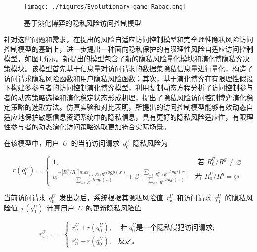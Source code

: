 \documentclass[pdftex,notypeinfo,twoside,openany,UTF8,fntef]{CASthesis}
\theoremstyle{THrm}{
	\newtheorem{question}{Question}[section]
	\newtheorem{property}{性质}[section]
	\newtheorem{assumption}{假设}[section]
	\newtheorem{claim}[lemma]{断言}
	
}
\begin{document}
\begin{figure}[htbp]
	\centering
	\texttt{[image: ./figures/Evolutionary-game-Rabac.png]}
	\caption{基于演化博弈的隐私风险访问控制模型}
	\label{fig:Evolutionary-game-Rabac}
\end{figure}

针对这些问题和需求，在提出的风险自适应访问控制模型和完全理性隐私风险访问控制模型的基础上，进一步提出一种面向隐私保护的有限理性风险自适应访问控制模型，如图\ref{fig:Evolutionary-game-Rabac}所示。新提出的模型包含了新的隐私风险量化模块和演化博隐私弈决策模块。该模型首先基于信息量对访问请求的数据集隐私信息量进行量化，构造了访问请求隐私风险函数和用户隐私风险函数；其次，基于演化博弈在有限理性假设下构建多参与者的访问控制演化博弈模型，利用复制动态方程分析了访问控制参与者的动态策略选择和演化稳定状态形成机理，提出了隐私风险访问控制博弈演化稳定策略的选取方法。仿真实验和对比表明，所提出的访问控制模型能够有效动态自适应地保护敏感信息资源系统中的隐私信息，具有更好的隐私风险适应性，有限理性参与者的动态演化访问策略选取更加符合实际场景。

在该模型中，用户~$U$~的当前访问请求~$q_{0}^{U}$~隐私风险为

\begin{equation}
r(q_{0}^{U})=\begin{cases}
1, & \text{ 若 } R_{0}^{U}/{{R}^{g}}\ne \varnothing \\
\alpha \frac{-|R_{0}^{U}/{R}^{U}|max_{x\in R_{0}^{U}/{R}^{U}}logp(x)}{-\sum_{x\in{R^U}}logp(x)}+ \beta \frac{-\sum_{x\in R_0^U \cap  R^U}logp(x)}{-\sum_{x\in  R^U}logp(x)}& \text{若 } R_{0}^{U}/{{R}^{g}}=\varnothing
\end{cases}
\end{equation}

当前访问请求~$q_{0}^{U}$~发出之后，系统根据其隐私风险值~$r_{n}^{U}$~和访问请求~$q_{0}^{U}$~的隐私风险值~$r(q_{0}^{U})$~计算用户~$U$~的更新隐私风险值

\begin{equation}\label{eq:users-risk}
r_{n+1}^{U}=\begin{cases}
r_{n}^{U}+r(q_0^U), & \text{ 若 } q_0^U \text{是一个隐私侵犯访问请求}; \\
r_{n}^{U}-r(q_0^U),& \text{反之。}
\end{cases}
\end{equation}
\end{document}
